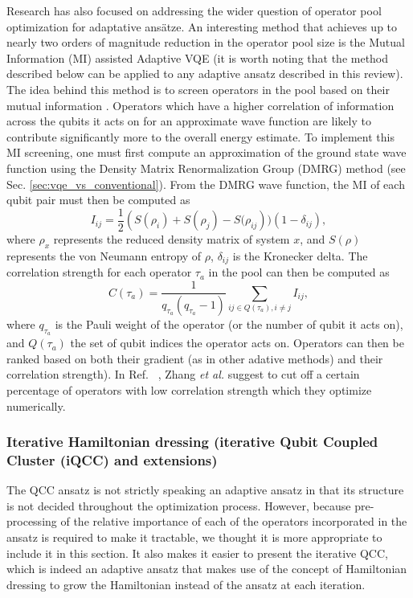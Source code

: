 Research has also focused on addressing the wider question of operator pool optimization for adaptative ans{\"{a}}tze. An interesting method that achieves up to nearly two orders of magnitude reduction in the operator pool size is the Mutual Information (MI) assisted Adaptive VQE \cite{Zhang2021_CEP} (it is worth noting that the method described below can be applied to any adaptive ansatz described in this review).
The idea behind this method is to screen operators in the pool based on their mutual information \cite{Amico2008, Huang2005, Rissler2006}. Operators which have a higher correlation of information across the qubits it acts on for an approximate wave function are likely to contribute significantly more to the overall energy estimate. To implement this MI screening, one must first compute an approximation of the ground state wave function using the Density Matrix Renormalization Group (DMRG) method (see Sec. \ref{sec:vqe_vs_conventional}). From the DMRG wave function, the MI of each qubit pair must then be computed as
\begin{equation} \label{eq:mutual_information}
    I_{ij} = \frac{1}{2} \left( S(\rho_i) + S(\rho_j) - S(\rho_{ij} \right)) (1 - \delta_{ij}),
\end{equation}
where $\rho_{x}$ represents the reduced density matrix of system $x$, and $S(\rho)$ represents the von Neumann entropy of $\rho$, $\delta_{ij}$ is the Kronecker delta. The correlation strength for each operator $\tau_a$ in the pool can then be computed as
\begin{equation}
    C(\tau_a) = \frac{1}{q_{\tau_a}(q_{\tau_a} - 1)} \sum_{ij \in Q(\tau_a), i \neq j } I_{ij},
\end{equation}
where $q_{\tau_a}$ is the Pauli weight of the operator (or the number of qubit it acts on), and $Q(\tau_a)$ the set of qubit indices the operator acts on. Operators can then be ranked based on both their gradient (as in other adative methods) and their correlation strength). In Ref.~ \cite{Zhang2021_CEP}, Zhang \textit{et al.} suggest to cut off a certain percentage of operators with low correlation strength which they optimize numerically.

\subsubsection{Iterative Hamiltonian dressing (iterative Qubit Coupled Cluster (iQCC) and extensions)} \label{sec:Hamiltonian_dressing}
The QCC ansatz \cite{Ryabinkin2018} is not strictly speaking an adaptive ansatz in that its structure is not decided throughout the optimization process. However, because pre-processing of the relative importance of each of the operators incorporated in the ansatz is required to make it tractable, we thought it is more appropriate to include it in this section. It also makes it easier to present the iterative QCC, which is indeed an adaptive ansatz that makes use of the concept of Hamiltonian dressing to grow the Hamiltonian instead of the ansatz at each iteration.

